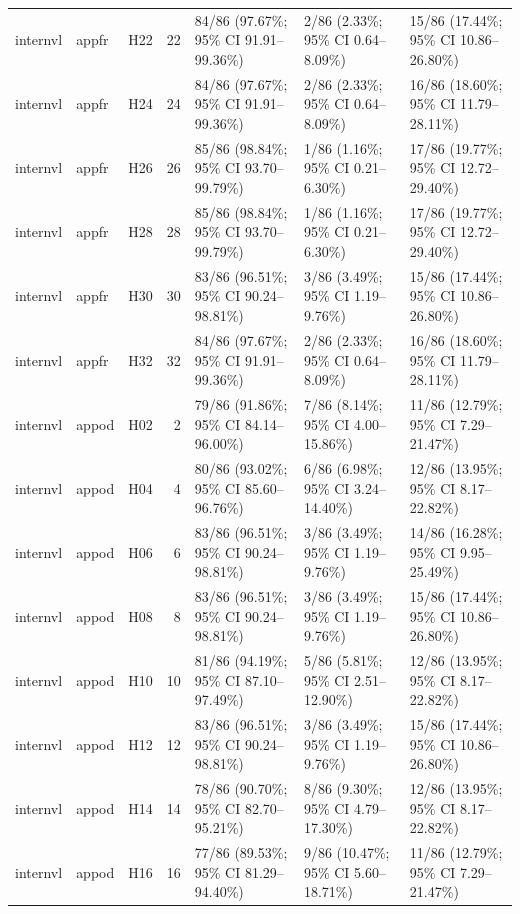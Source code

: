 \begin{longtable}{lllrlll}
internvl & appfr & H22 & 22 & 84/86 (97.67\%; 95\% CI 91.91–99.36\%) & 2/86 (2.33\%; 95\% CI 0.64–8.09\%) & 15/86 (17.44\%; 95\% CI 10.86–26.80\%) \\
internvl & appfr & H24 & 24 & 84/86 (97.67\%; 95\% CI 91.91–99.36\%) & 2/86 (2.33\%; 95\% CI 0.64–8.09\%) & 16/86 (18.60\%; 95\% CI 11.79–28.11\%) \\
internvl & appfr & H26 & 26 & 85/86 (98.84\%; 95\% CI 93.70–99.79\%) & 1/86 (1.16\%; 95\% CI 0.21–6.30\%) & 17/86 (19.77\%; 95\% CI 12.72–29.40\%) \\
internvl & appfr & H28 & 28 & 85/86 (98.84\%; 95\% CI 93.70–99.79\%) & 1/86 (1.16\%; 95\% CI 0.21–6.30\%) & 17/86 (19.77\%; 95\% CI 12.72–29.40\%) \\
internvl & appfr & H30 & 30 & 83/86 (96.51\%; 95\% CI 90.24–98.81\%) & 3/86 (3.49\%; 95\% CI 1.19–9.76\%) & 15/86 (17.44\%; 95\% CI 10.86–26.80\%) \\
internvl & appfr & H32 & 32 & 84/86 (97.67\%; 95\% CI 91.91–99.36\%) & 2/86 (2.33\%; 95\% CI 0.64–8.09\%) & 16/86 (18.60\%; 95\% CI 11.79–28.11\%) \\
internvl & appod & H02 & 2 & 79/86 (91.86\%; 95\% CI 84.14–96.00\%) & 7/86 (8.14\%; 95\% CI 4.00–15.86\%) & 11/86 (12.79\%; 95\% CI 7.29–21.47\%) \\
internvl & appod & H04 & 4 & 80/86 (93.02\%; 95\% CI 85.60–96.76\%) & 6/86 (6.98\%; 95\% CI 3.24–14.40\%) & 12/86 (13.95\%; 95\% CI 8.17–22.82\%) \\
internvl & appod & H06 & 6 & 83/86 (96.51\%; 95\% CI 90.24–98.81\%) & 3/86 (3.49\%; 95\% CI 1.19–9.76\%) & 14/86 (16.28\%; 95\% CI 9.95–25.49\%) \\
internvl & appod & H08 & 8 & 83/86 (96.51\%; 95\% CI 90.24–98.81\%) & 3/86 (3.49\%; 95\% CI 1.19–9.76\%) & 15/86 (17.44\%; 95\% CI 10.86–26.80\%) \\
internvl & appod & H10 & 10 & 81/86 (94.19\%; 95\% CI 87.10–97.49\%) & 5/86 (5.81\%; 95\% CI 2.51–12.90\%) & 12/86 (13.95\%; 95\% CI 8.17–22.82\%) \\
internvl & appod & H12 & 12 & 83/86 (96.51\%; 95\% CI 90.24–98.81\%) & 3/86 (3.49\%; 95\% CI 1.19–9.76\%) & 15/86 (17.44\%; 95\% CI 10.86–26.80\%) \\
internvl & appod & H14 & 14 & 78/86 (90.70\%; 95\% CI 82.70–95.21\%) & 8/86 (9.30\%; 95\% CI 4.79–17.30\%) & 12/86 (13.95\%; 95\% CI 8.17–22.82\%) \\
internvl & appod & H16 & 16 & 77/86 (89.53\%; 95\% CI 81.29–94.40\%) & 9/86 (10.47\%; 95\% CI 5.60–18.71\%) & 11/86 (12.79\%; 95\% CI 7.29–21.47\%) \\

\end{longtable}
